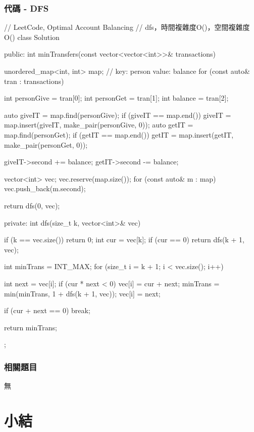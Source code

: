 \subsubsection{代碼 - DFS}
\begin{Code}
// LeetCode, Optimal Account Balancing
// dfs，時間複雜度O()，空間複雜度O()
class Solution {
public:
    int minTransfers(const vector<vector<int>>& transactions)
    {
        unordered_map<int, int> map; // key: person value: balance
        for (const auto& tran : transactions)
        {
            int personGive = tran[0];
            int personGet = tran[1];
            int balance = tran[2];

            auto giveIT = map.find(personGive);
            if (giveIT == map.end()) giveIT = map.insert(giveIT, make_pair(personGive, 0));
            auto getIT = map.find(personGet);
            if (getIT == map.end()) getIT = map.insert(getIT, make_pair(personGet, 0));

            giveIT->second += balance;
            getIT->second -= balance;
        }

        vector<int> vec; vec.reserve(map.size());
        for (const auto& m : map)
        {
            vec.push_back(m.second);
        }

        return dfs(0, vec);
    }
private:
    int dfs(size_t k, vector<int>& vec)
    {
        if (k == vec.size()) return 0;
        int cur = vec[k];
        if (cur == 0)
            return dfs(k + 1, vec);

        int minTrans = INT_MAX;
        for (size_t i = k + 1; i < vec.size(); i++)
        {
            int next = vec[i];
            if (cur * next < 0)
            {
                vec[i] = cur + next;
                minTrans = min(minTrans, 1 + dfs(k + 1, vec));
                vec[i] = next;
            }

            if (cur + next == 0) break;
        }

        return minTrans;
    }
};
\end{Code}


\subsubsection{相關題目}
\begindot
\item 無
\myenddot

\section{小結} %
\label{sec:dfs-template}


